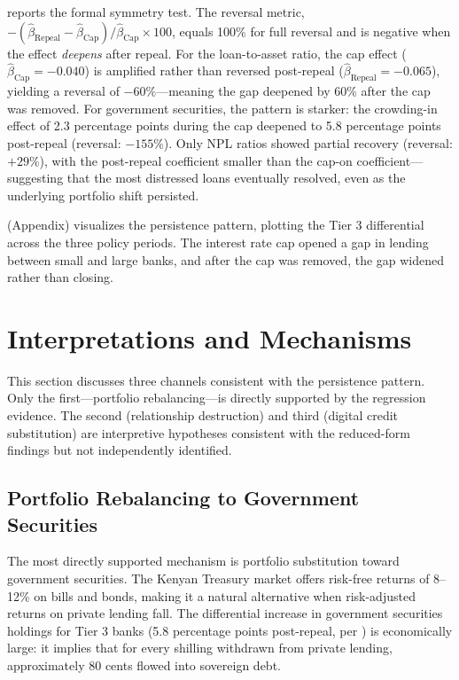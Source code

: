 \documentclass[12pt]{article}
\begin{document}
 reports the formal symmetry test. The reversal metric, $-(\hat{\beta}_{\text{Repeal}} - \hat{\beta}_{\text{Cap}})/\hat{\beta}_{\text{Cap}} \times 100$, equals 100\% for full reversal and is negative when the effect \textit{deepens} after repeal. For the loan-to-asset ratio, the cap effect ($\hat{\beta}_{\text{Cap}} = -0.040$) is amplified rather than reversed post-repeal ($\hat{\beta}_{\text{Repeal}} = -0.065$), yielding a reversal of $-60\%$---meaning the gap deepened by 60\% after the cap was removed. For government securities, the pattern is starker: the crowding-in effect of 2.3 percentage points during the cap deepened to 5.8 percentage points post-repeal (reversal: $-155\%$). Only NPL ratios showed partial recovery (reversal: $+29\%$), with the post-repeal coefficient smaller than the cap-on coefficient---suggesting that the most distressed loans eventually resolved, even as the underlying portfolio shift persisted.



 (Appendix) visualizes the persistence pattern, plotting the Tier 3 differential across the three policy periods. The interest rate cap opened a gap in lending between small and large banks, and after the cap was removed, the gap widened rather than closing.


\section{Interpretations and Mechanisms}
\label{sec:mechanisms}

This section discusses three channels consistent with the persistence pattern. Only the first---portfolio rebalancing---is directly supported by the regression evidence. The second (relationship destruction) and third (digital credit substitution) are interpretive hypotheses consistent with the reduced-form findings but not independently identified.

\subsection{Portfolio Rebalancing to Government Securities}

The most directly supported mechanism is portfolio substitution toward government securities. The Kenyan Treasury market offers risk-free returns of 8--12\% on bills and bonds, making it a natural alternative when risk-adjusted returns on private lending fall. The differential increase in government securities holdings for Tier 3 banks (5.8 percentage points post-repeal, per ) is economically large: it implies that for every shilling withdrawn from private lending, approximately 80 cents flowed into sovereign debt.
\end{document}
